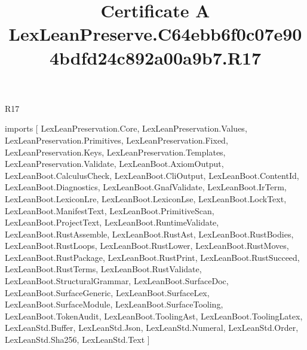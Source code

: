\begin{lexlean}{R17}
\title{Certificate A LexLeanPreserve.C64ebb6f0c07e904bdfd24c892a00a9b7.R17}
\begin{coremodule}
imports [
  LexLeanPreservation.Core,
  LexLeanPreservation.Values,
  LexLeanPreservation.Primitives,
  LexLeanPreservation.Fixed,
  LexLeanPreservation.Keys,
  LexLeanPreservation.Templates,
  LexLeanPreservation.Validate,
  LexLeanBoot.AxiomOutput,
  LexLeanBoot.CalculusCheck,
  LexLeanBoot.CliOutput,
  LexLeanBoot.ContentId,
  LexLeanBoot.Diagnostics,
  LexLeanBoot.GnafValidate,
  LexLeanBoot.IrTerm,
  LexLeanBoot.LexiconLre,
  LexLeanBoot.LexiconLse,
  LexLeanBoot.LockText,
  LexLeanBoot.ManifestText,
  LexLeanBoot.PrimitiveScan,
  LexLeanBoot.ProjectText,
  LexLeanBoot.RuntimeValidate,
  LexLeanBoot.RustAssemble,
  LexLeanBoot.RustAst,
  LexLeanBoot.RustBodies,
  LexLeanBoot.RustLoops,
  LexLeanBoot.RustLower,
  LexLeanBoot.RustMoves,
  LexLeanBoot.RustPackage,
  LexLeanBoot.RustPrint,
  LexLeanBoot.RustSucceed,
  LexLeanBoot.RustTerms,
  LexLeanBoot.RustValidate,
  LexLeanBoot.StructuralGrammar,
  LexLeanBoot.SurfaceDoc,
  LexLeanBoot.SurfaceGeneric,
  LexLeanBoot.SurfaceLex,
  LexLeanBoot.SurfaceModule,
  LexLeanBoot.SurfaceTooling,
  LexLeanBoot.TokenAudit,
  LexLeanBoot.ToolingAst,
  LexLeanBoot.ToolingLatex,
  LexLeanStd.Buffer,
  LexLeanStd.Json,
  LexLeanStd.Numeral,
  LexLeanStd.Order,
  LexLeanStd.Sha256,
  LexLeanStd.Text
]


\end{coremodule}
\end{lexlean}
